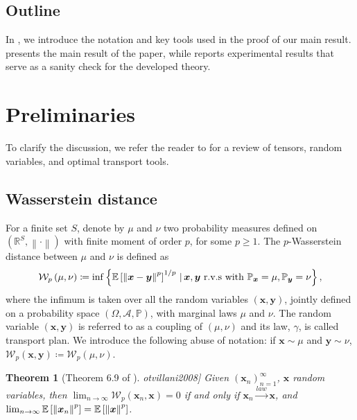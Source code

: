 \documentclass[a4paper, 11pt, reqno]{amsart}
\newcommand{\citet}[2][]{\citeauthor{#2} \cite[#1]{#2}}
\theoremstyle{plain}
\newtheorem{theorem}{Theorem}[section]
\theoremstyle{remark}
\theoremstyle{definition}
\newcommand{\mean}[2][\kern-0.5pt]{\mathbb{E}_{#1}\left[#2\right]}
\newcommand{\given}{\, | \,}
\newcommand{\wass}[3][2]{\mathcal{W}_{#1}\left(#2, #3\right)}
\newcommand{\real}{\mathbb{R}}
\newcommand{\norm}[1]{\left\lVert#1\right\rVert}
\begin{document}
\subsection{Outline}

In , we introduce the notation and key tools used in the proof of our main result. 
 presents the main result of the paper, while  reports experimental results that serve as a sanity check for the developed theory.

\section{Preliminaries} \label{sec:bnns}

To clarify the discussion, we refer the reader to  for a review of tensors, random variables, and optimal transport tools.

\subsection{Wasserstein distance}

For a finite set $S$, denote by $\mu$ and $\nu$ two probability measures defined on $(\real^S, \norm{\cdot})$ with finite moment of order $p$, for some $p \geq 1$. The $p$-Wasserstein distance between $\mu$ and $\nu$ is defined as
\begin{equation*}
    \wass[p]{\mu}{\nu} \coloneqq \inf\left\{\mean{\norm{\bm{x} - \bm{y}}^p}^{1/p} \given \bm{x}, \bm{y} \text{ r.v.s with } \mathbb{P}_{\bm{x}} = \mu, \mathbb{P}_{\bm{y}} = \nu\right\},
\end{equation*}
where the infimum is taken over all the random variables $(\bm{x}, \bm{y})$, jointly defined on a probability space $(\Omega, \mathcal{A}, \mathbb{P})$, with marginal laws $\mu$ and $\nu$. 
The random variable $(\bm{x}, \bm{y})$ is referred to as a coupling of $(\mu, \nu)$ and its law, $\gamma$, is called transport plan. We introduce the following abuse of notation: if $\bm{x} \sim \mu$ and $\bm{y} \sim \nu$, $\wass[p]{\bm{x}}{\bm{y}} \coloneqq \wass[p]{\mu}{\nu}$. 

\begin{theorem}[Theorem 6.9 of \citet{otvillani2008}] \label{thm:wassdist}
    Given $(\bm{x}_n)_{n = 1}^{\infty}$, $\bm{x}$ random variables, then $\lim_{n \to \infty} \wass[p]{\bm{x}_n}{\bm{x}} = 0$ if and only if $\bm{x}_n \xrightarrow{law} \bm{x}$, and $\lim_{n \to \infty} \mean{\norm{\bm{x}_n}^p} = \mean{\norm{\bm{x}}^p}$.
\end{theorem}
\end{document}
